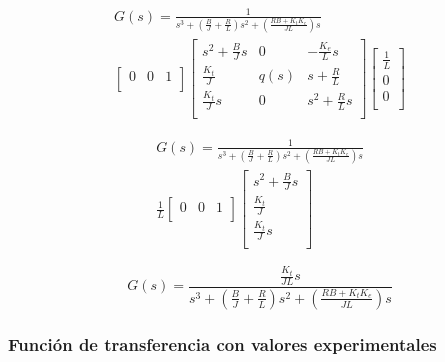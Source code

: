\begin{multline*}
  G(s) =
    \frac{1}{s^3 + \left(\frac{B}{J} + \frac{R}{L}\right)s^2 + \left(\frac{RB + K_t K_e}{JL}\right)s}\\
    \begin{bmatrix}
      0 & 0 & 1 \\
    \end{bmatrix}
    \begin{bmatrix}
      s^2 + \frac{B}{J}s  &   
      0                   &   
     -\frac{K_e}L s       \\  
      \frac{K_t}{J}       & 
      q(s)                & 
      s +\frac{R}L        \\
      \frac{K_t}Js        &
      0                   &
      s^2+\frac{R}Ls      \\
    \end{bmatrix}
    \begin{bmatrix}
      \frac1L \\ 0 \\ 0 \\
    \end{bmatrix}
\end{multline*}

\begin{multline*}
  G(s) =
    \frac{1}{s^3 + \left(\frac{B}{J} + \frac{R}{L}\right)s^2 + \left(\frac{RB + K_t K_e}{JL}\right)s}\\
    \frac1L
    \begin{bmatrix}
      0 & 0 & 1 \\
    \end{bmatrix}
    \begin{bmatrix}
      s^2 + \frac{B}{J}s  \\
      \frac{K_t}{J}       \\
      \frac{K_t}Js        \\
    \end{bmatrix}
\end{multline*}

\begin{equation}
  G(s) =
    \frac{\frac{K_t}{JL}s}{s^3 + \left(\frac{B}{J} + \frac{R}{L}\right)s^2 + \left(\frac{RB + K_t K_e}{JL}\right)s}
\end{equation}


\subsubsection{Función de transferencia con valores experimentales}

